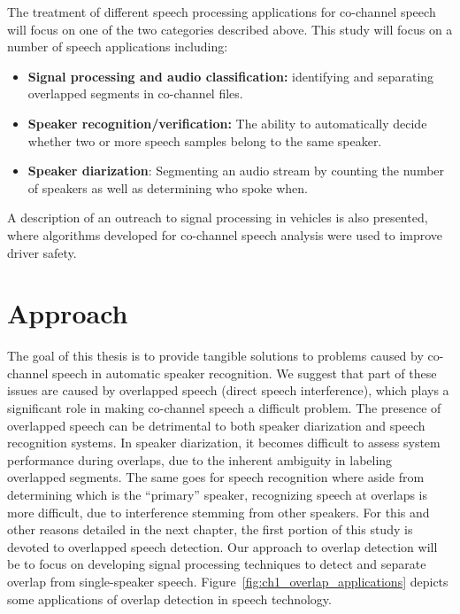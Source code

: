 The treatment of different speech processing applications for co-channel speech will focus on one of the two categories described above. 
This study will focus on a number of speech applications including: 
\begin{itemize}
	\item {\bf Signal processing and audio classification:} identifying and separating overlapped segments in co-channel files. 
	\item {\bf Speaker recognition/verification:} The ability to automatically decide whether two or more speech samples belong to the same speaker. 
	\item {\bf Speaker diarization}: Segmenting an audio stream by counting the number of speakers as well as determining who spoke when. 
\end{itemize}

A description of an outreach to signal processing in vehicles is also presented, where algorithms developed for co-channel speech analysis were used to improve driver safety. 

\section{Approach}

The goal of this thesis is to provide tangible solutions to problems caused by co-channel speech in automatic speaker recognition. 
We suggest that part of these issues are caused by overlapped speech (direct speech interference), which plays a significant role in making co-channel speech a difficult problem. 
The presence of overlapped speech can be detrimental to both speaker diarization and speech recognition systems. 
In speaker diarization, it becomes difficult to assess system performance during overlaps, due to the inherent ambiguity in labeling overlapped segments. 
The same goes for speech recognition where aside from determining which is the ``primary'' speaker, recognizing speech at overlaps is more difficult, due to interference stemming from other speakers. 
For this and other reasons detailed in the next chapter, the first portion of this study is devoted to overlapped speech detection. 
Our approach to overlap detection will be to focus on developing signal processing techniques to detect and separate overlap from single-speaker speech. Figure~\ref{fig:ch1_overlap_applications} depicts some applications of overlap detection in speech technology. 

